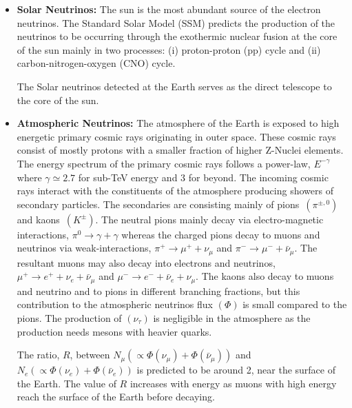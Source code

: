 \begin{itemize}
\item \textbf{Solar Neutrinos:} The sun is the most abundant source of
  the electron neutrinos. The Standard Solar Model (SSM)\cite{SSM}
  predicts the production of the neutrinos to be occurring through the
  exothermic nuclear fusion at the core of the sun mainly in two
  processes: (i) proton-proton (pp) cycle and
  (ii) carbon-nitrogen-oxygen (CNO) cycle.
  
  The Solar neutrinos detected at the Earth serves as the direct
  telescope to the core of the sun.
  
\item \textbf{Atmospheric Neutrinos:} The atmosphere of the Earth is
  exposed to high energetic primary cosmic rays originating in outer
  space. These cosmic rays consist of mostly protons with a smaller
  fraction of higher \mbox{Z-Nuclei} elements\cite{cosmic1}. The
  energy spectrum of the primary cosmic rays follows a power-law,
  $E^{-\gamma}$ where $\gamma\simeq 2.7$ for sub-TeV energy and 3 for
  beyond. The incoming cosmic rays interact with the constituents
  of the atmosphere producing showers of secondary particles.
  The secondaries are consisting mainly of
  \mbox{pions $\left(\pi^{\pm,0}\right)$} and
  \mbox{kaons $\left(K^{\pm}\right)$}. The neutral pions mainly decay
  via electro-magnetic interactions, $\pi^0 \rightarrow \gamma+\gamma$
  whereas the charged pions decay to muons and neutrinos via
  weak-interactions, $\pi^+ \rightarrow \mu^+ + \nu_{\mu}$ and
  $\pi^- \rightarrow \mu^- + \bar{\nu}_{\mu}$. The resultant muons may
  also decay into electrons and neutrinos,
  $\mu^+ \rightarrow e^+ + \nu_{e} + \bar{\nu}_{\mu}$ and
  $\mu^- \rightarrow e^- + \bar{\nu}_{e} + \nu_{\mu}$. The kaons also
  decay to muons and neutrino and to pions in different branching
  fractions, but this contribution to the atmospheric neutrinos flux
  $\left(\Phi\right)$ is small compared to the pions. The production
  of $\left(\nu_{\tau}\right)$ is negligible in the atmosphere as the
  production needs mesons with heavier quarks.
  
  The ratio, $R$, between $N_{\mu}\left(\propto \Phi\left(\nu_{\mu}\right)+\Phi\left(\bar{\nu}_{\mu}\right)\right)$ and $N_{e}\left( \propto\Phi\left(\nu_{e}\right)+\Phi\left(\bar{\nu}_{e}\right)\right)$ is predicted to be around 2,
  near the surface of the Earth. The value of $R$ increases with
  energy as muons with high energy reach the surface of the Earth
  before decaying.
  

\end{itemize}
